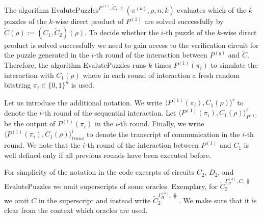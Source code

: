 %
The algorithm $\text{EvalutePuzzles}^{P^{(1)}, \widetilde{C}, \hash}(\pi^{(k)}, \rho, n, k)$
evaluates which of the $k$ puzzles of the $k$-wise direct product of $P^{(1)}$ are solved successfully by $\widetilde{C}(\rho) := (C_1,\widetilde{C}_2)(\rho)$.
To decide whether the $i$-th puzzle of the $k$-wise direct product is solved successfully we need to gain access to the verification circuit
for the puzzle generated in the $i$-th round of the interaction between $P^{(g)}$ and $\widetilde{C}$.
Therefore, the algorithm EvalutePuzzles runs $k$ times $P^{(1)}(\pi_i)$ to simulate the interaction with
$C_1(\rho)$ where in each round of interaction a fresh random bitstring $\pi_i \in \{0,1\}^{n}$ is used.

Let us introduce the additional notation.
We write $\langle P^{(1)}(\pi_i), C_1(\rho)\rangle^i$ to denote the $i$-th round of the sequential interaction.
Let $\langle P^{(1)}(\pi_i), C_1(\rho)\rangle^i_{P^{(1)}}$ be the output of $P^{(1)}(\pi_i)$ in the $i$-th round.
Finally, we write $\langle P^{(1)}(\pi_i), C_1(\rho)\rangle^i_{\mathit{trans}}$ to denote the transcript of communication in the $i$-th round.
We note that the $i$-th round of the interaction between $P^{(1)}$ and $C_1$ is well defined only if all previous rounds have been executed before.

For simplicity of the notation in the code excerpts of circuits $C_2$, $D_2$, and EvalutePuzzles we omit superscripts of some oracles.
Exemplary, for $\widetilde{C}_2^{\Gamma_H^{(k)}, C, \hash}$ we omit $C$ in the superscript and instead write $\widetilde{C}_2^{\Gamma_H^{(k)}, \hash}$.
We make sure that it is clear from the context which oracles are used.

